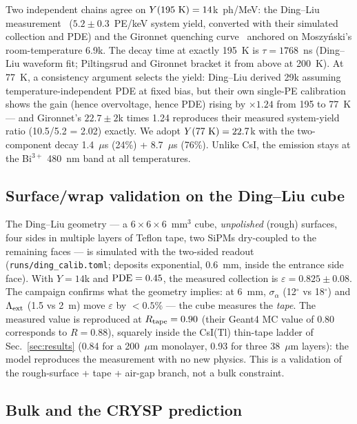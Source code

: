 \documentclass[11pt,a4paper]{article}
\newcommand{\csitl}{CsI(Tl)}
\newcommand{\lext}{\Lambda_{\rm ext}}
\newcommand{\sa}{\sigma_\alpha}
\begin{document}
Two independent chains agree on $Y(195~{\rm K}) = 14$k~ph/MeV: the Ding--Liu
measurement~\cite{ding2024} ($5.2\pm0.3$~PE/keV system yield, converted with their
simulated collection and PDE) and the Gironnet quenching curve~\cite{gironnet2008}
anchored on Moszy\'nski's room-temperature 6.9k. The decay time at exactly 195~K is
$\tau = 1768$~ns (Ding--Liu waveform fit; Piltingsrud and Gironnet bracket it from
above at 200~K). At 77~K, a consistency argument selects the yield: Ding--Liu derived
29k assuming temperature-independent PDE at fixed bias, but their own single-PE
calibration shows the gain (hence overvoltage, hence PDE) rising by $\times1.24$ from
195 to 77~K --- and Gironnet's $22.7\pm2$k times 1.24 reproduces their measured
system-yield ratio (10.5/5.2 = 2.02) exactly. We adopt $Y(77~{\rm K}) = 22.7$k with the
two-component decay 1.4~$\mu$s (24\%) + 8.7~$\mu$s (76\%). Unlike CsI, the emission
stays at the Bi$^{3+}$ 480~nm band at all temperatures.

\subsection{Surface/wrap validation on the Ding--Liu cube}

The Ding--Liu geometry --- a $6\times6\times6$~mm$^3$ cube, \emph{unpolished} (rough)
surfaces, four sides in multiple layers of Teflon tape, two SiPMs dry-coupled to the
remaining faces --- is simulated with the two-sided readout
(\texttt{runs/ding\_calib.toml}; deposits exponential, 0.6~mm, inside the entrance side
face). With $Y = 14$k and ${\rm PDE} = 0.45$, the measured collection is
$\varepsilon = 0.825 \pm 0.08$. The campaign confirms what the geometry implies: at
6~mm, $\sa$ (12$^\circ$ vs 18$^\circ$) and $\lext$ (1.5 vs 2~m) move $\varepsilon$ by
$<0.5\%$ --- the cube measures the \emph{tape}. The measured value is reproduced at
$R_{\rm tape} = 0.90$ (their Geant4 MC value of 0.80 corresponds to $R = 0.88$),
squarely inside the \csitl{} thin-tape ladder of Sec.~\ref{sec:results}
(0.84 for a 200~$\mu$m monolayer, 0.93 for three 38~$\mu$m layers): the model
reproduces the measurement with no new physics. This is a validation of the
rough-surface + tape + air-gap branch, not a bulk constraint.

\subsection{Bulk and the CRYSP prediction}
\end{document}
